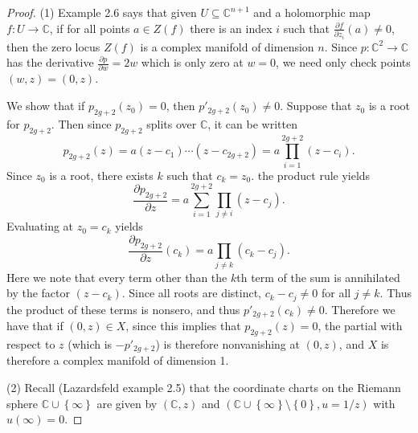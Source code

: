 \documentclass[11pt, letterpaper]{article}
\theoremstyle{plain}
\begin{document}
\begin{proof}
	(1) Example 2.6 says that given $U\subseteq \mathbb{C} ^{n+1} $ and a holomorphic map $f : U \to \mathbb{C} $, if for all points $a\in Z(f)$ there is an index $i$ such that $\frac{\partial f}{\partial z_i}(a) \neq 0$, then the zero locus $Z(f)$ is a complex manifold of dimension $n$. Since $p : \mathbb{C} ^2 \to \mathbb{C} $ has the derivative $\frac{\partial p}{\partial w} =2w$ which is only zero at $w=0$, we need only check points $(w,z)=(0,z)$.

	We show that if $p_{2g+2} (z_0)=0$, then $p'_{2g+2} (z_0)\neq 0$. Suppose that $z_0$ is a root for $p_{2g+2} $. Then since $p_{2g+2}$ splits over $\mathbb{C} $, it can be written
	\[
		p_{2g+2} (z)=a(z - c_1)\cdots (z-c_{2g+2} ) = a \prod_{i=1}^{2g+2} (z-c_i).
\]
	Since $z_0$ is a root, there exists $k$ such that $c_k=z_0$. the product rule yields
	\[
		\frac{\partial p_{2g+2} }{\partial z} =a\sum_{i=1}^{2g+2} \prod_{j\neq i} (z-c_j)
	.\]
	Evaluating at $z_0=c_k$ yields
	\[
		\frac{\partial p_{2g+2} }{\partial z} (c_k) = a \prod_{j\neq k} (c_k-c_j)
	.\]
	Here we note that every term other than the $k$th term of the sum is annihilated by the factor $(z-c_k)$. Since all roots are distinct, $c_k-c_j\neq 0$ for all $j\neq k$. Thus the product of these terms is nonsero, and thus $p'_{2g+2} (c_k)\neq 0$. Therefore we have that if $(0,z)\in X$, since this implies that $p_{2g+2} (z)=0$, the partial with respect to $z$ (which is $-p'_{2g+2} $) is therefore nonvanishing at $(0,z)$, and $X$ is therefore a complex manifold of dimension 1.

	(2) Recall (Lazardsfeld example 2.5) that the coordinate charts on the Riemann sphere $\mathbb{C} \cup \left\{ \infty  \right\} $ are given by $(\mathbb{C} ,z)$ and $(\mathbb{C}\cup \left\{ \infty  \right\} \setminus \left\{ 0 \right\} ,u=1/z)$ with $u(\infty )=0$.


\end{proof}
\end{document}
